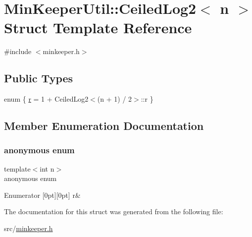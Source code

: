 \hypertarget{structMinKeeperUtil_1_1CeiledLog2}{}\section{Min\+Keeper\+Util\+:\+:Ceiled\+Log2$<$ n $>$ Struct Template Reference}
\label{structMinKeeperUtil_1_1CeiledLog2}


{\ttfamily \#include $<$minkeeper.\+h$>$}

\subsection*{Public Types}
\begin{DoxyCompactItemize}
\item 
enum \{ \hyperlink{structMinKeeperUtil_1_1CeiledLog2_ae163e7299724c7e999e7bdc0bf4f37e8a166207d435f94e516e36c590e9936e94}{r} = 1 + Ceiled\+Log2$<$(n + 1) / 2$>$\+:\+:r
 \}
\end{DoxyCompactItemize}


\subsection{Member Enumeration Documentation}
\mbox{\label{structMinKeeperUtil_1_1CeiledLog2_ae163e7299724c7e999e7bdc0bf4f37e8}} 
\subsubsection{\texorpdfstring{anonymous enum}{anonymous enum}}
{\footnotesize\ttfamily template$<$int n$>$ \\
anonymous enum}

\begin{DoxyEnumFields}{Enumerator}
[0pt][0pt]{}\mbox{\label{structMinKeeperUtil_1_1CeiledLog2_ae163e7299724c7e999e7bdc0bf4f37e8a166207d435f94e516e36c590e9936e94}} 
r&\\
\hline

\end{DoxyEnumFields}


The documentation for this struct was generated from the following file\+:\begin{DoxyCompactItemize}
\item 
src/\hyperlink{minkeeper_8h}{minkeeper.\+h}\end{DoxyCompactItemize}

